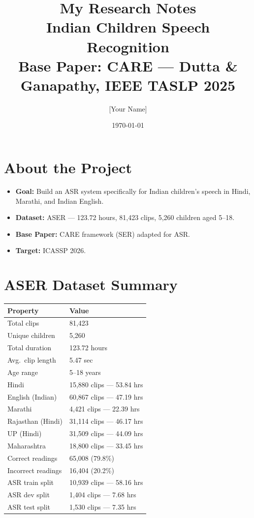 \documentclass[12pt, a4paper]{article}
\title{
  \textbf{My Research Notes}\\[4pt]
  \large Indian Children Speech Recognition\\[2pt]
  \normalsize Base Paper: CARE --- Dutta \& Ganapathy, IEEE TASLP 2025
}
\author{[Your Name]}
\date{\today}
\begin{document}
\maketitle
\tableofcontents
\newpage

\section{About the Project}

\begin{itemize}[leftmargin=*]
  \item \textbf{Goal:} Build an ASR system specifically for Indian
        children's speech in Hindi, Marathi, and Indian English.
  \item \textbf{Dataset:} ASER --- 123.72 hours, 81,423 clips,
        5,260 children aged 5--18.
  \item \textbf{Base Paper:} CARE framework (SER) adapted for ASR.
  \item \textbf{Target:} ICASSP 2026.
\end{itemize}

\section{ASER Dataset Summary}

\begin{center}
\begin{tabular}{ll}
\toprule
\textbf{Property} & \textbf{Value} \\
\midrule
Total clips        & 81,423 \\
Unique children    & 5,260 \\
Total duration     & 123.72 hours \\
Avg.\ clip length  & 5.47 sec \\
Age range          & 5--18 years \\
\midrule
Hindi              & 15,880 clips — 53.84 hrs \\
English (Indian)   & 60,867 clips — 47.19 hrs \\
Marathi            &  4,421 clips — 22.39 hrs \\
\midrule
Rajasthan (Hindi)  & 31,114 clips — 46.17 hrs \\
UP (Hindi)         & 31,509 clips — 44.09 hrs \\
Maharashtra        & 18,800 clips — 33.45 hrs \\
\midrule
Correct readings   & 65,008 (79.8\%) \\
Incorrect readings & 16,404 (20.2\%) \\
\midrule
ASR train split    & 10,939 clips — 58.16 hrs \\
ASR dev split      &  1,404 clips —  7.68 hrs \\
ASR test split     &  1,530 clips —  7.35 hrs \\
\bottomrule
\end{tabular}
\end{center}
\end{document}

